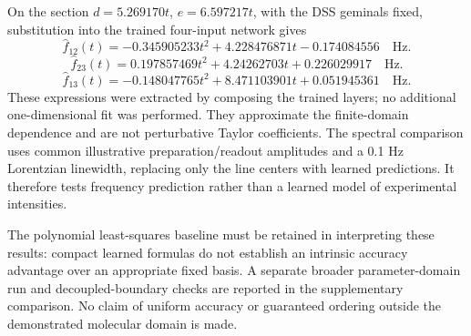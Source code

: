 On the section $d=5.269170t$, $e=6.597217t$, with the DSS geminals fixed,
substitution into the trained four-input network gives
\[\widehat f_{12}(t)=- 0.345905233 t^{2} + 4.228476871 t - 0.174084556\quad\mathrm{Hz}.\]
\[\widehat f_{23}(t)=0.197857469 t^{2} + 4.24262703 t + 0.226029917\quad\mathrm{Hz}.\]
\[\widehat f_{13}(t)=- 0.148047765 t^{2} + 8.471103901 t + 0.051945361\quad\mathrm{Hz}.\]
These expressions were extracted by composing the trained layers; no
additional one-dimensional fit was performed. They approximate the
finite-domain dependence and are not perturbative Taylor coefficients.
The spectral comparison uses common illustrative preparation/readout
amplitudes and a 0.1 Hz Lorentzian linewidth, replacing only the line centers
with learned predictions. It therefore tests frequency prediction rather
than a learned model of experimental intensities.

The polynomial least-squares baseline must be retained in interpreting
these results: compact learned formulas do not establish an intrinsic
accuracy advantage over an appropriate fixed basis. A separate broader
parameter-domain run and decoupled-boundary checks are reported in the
supplementary comparison. No claim of uniform accuracy or guaranteed
ordering outside the demonstrated molecular domain is made.
